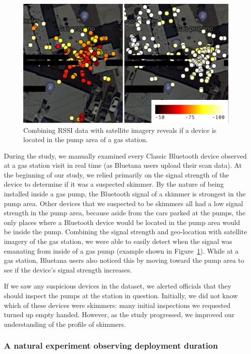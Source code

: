 \begin{figure}
\centering
\includegraphics[width=\linewidth]{skimmer/fig/rssi_motivation.pdf}
\caption{
\label{fig:rssi}
  Combining RSSI data with satellite imagery reveals if a device is located in the pump area of a gas station.
}
\end{figure}

During the study, we manually examined every Classic Bluetooth device observed
at a gas station visit in real time (as Bluetana users upload their scan data).
%
At the beginning of our study, we relied primarily on the signal strength of the device to determine if it was
a suspected skimmer.
%
By the nature of being installed inside a gas pump, the Bluetooth signal
of a skimmer is strongest in the pump area.
%
Other devices that we suspected to be skimmers all had a low signal strength
in the pump area, because aside from the cars parked at the pumps, the only
places where a Bluetooth device would be located in the pump area would be
inside the pump.
%
Combining the signal strength and geo-location with satellite
imagery of the gas station, we were able to easily detect when the signal was
emanating from inside of a gas pump (example shown in Figure~\ref{fig:rssi}).
%
While at a gas station, Bluetana users also noticed this by moving toward the
pump area to see if the device's signal strength increases.
%

If we saw any suspicious devices in the dataset, we alerted officials that they
should inspect the pumps at the station in question.
%
Initially, we did not know which of these devices were skimmers: many initial
inspections we requested turned up empty handed.
%
However, as the study progressed, we improved our understanding of the
profile of skimmers.

\subsubsection*{A natural experiment observing deployment duration}

